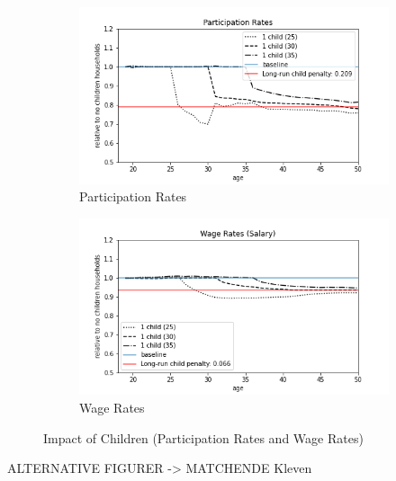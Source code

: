 \begin{figure}[ht]
\begin{subfigure}{.5\textwidth}
  \centering
  \includegraphics[width=1\linewidth]{figures/extended_model_event_participation_rates.png}
  \caption{Participation Rates}
  \label{fig:ext_model_event_partipation}
\end{subfigure}%
\begin{subfigure}{.5\textwidth}
  \centering
  \includegraphics[width=1\linewidth]{figures/extended_model_event_wage_rates.png}
  \caption{Wage Rates}
  \label{fig:ext_model_event_wage_rates}
\end{subfigure}
    \caption{Impact of Children (Participation Rates and Wage Rates)}
    \label{fig:ext_model_impact_participation_wage}
\end{figure}

ALTERNATIVE FIGURER -> MATCHENDE Kleven

